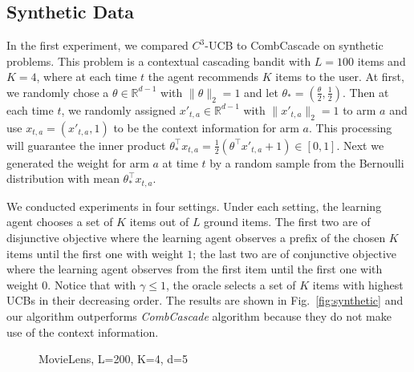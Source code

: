 \documentclass{article}
\newcommand{\RR}{\mathbb{R}}
\begin{document}
\subsection{Synthetic Data}
\label{sec:ExpSyn}

In the first experiment, we compared $C^3$-UCB to CombCascade on synthetic problems. This problem is a contextual cascading bandit with $L=100$ items and $K=4$, where at each time $t$ the agent recommends $K$ items to the user. At first, we randomly chose a $\theta \in \RR^{d-1}$ with $\|\theta \|_2 = 1$ and let $\theta_* = (\frac{\theta}{2}, \frac{1}{2})$. Then at each time $t$, we randomly assigned $x'_{t,a} \in \RR^{d-1}$ with $\|x'_{t,a}\|_2 = 1$ to arm $a$ and use $x_{t,a} = (x'_{t,a}, 1)$ to be the context information for arm $a$. This processing will guarantee the inner product $\theta_*^{\top}x_{t,a} = \frac{1}{2}(\theta^{\top}x'_{t,a} + 1) \in [0,1]$. Next we generated the weight for arm $a$ at time $t$ by a random sample from the Bernoulli distribution with mean $\theta_*^{\top}x_{t,a}$.

We conducted experiments in four settings. Under each setting, the learning agent chooses a set of $K$ items out of $L$ ground items. The first two are of disjunctive objective where the learning agent observes a prefix of the chosen $K$ items until the first one with weight $1$; the last two are of conjunctive objective where the learning agent observes from the first item until the first one with weight $0$. Notice that with $\gamma \leq 1$, the oracle selects a set of $K$ items with highest UCBs in their decreasing order. The results are shown in Fig.~\ref{fig:synthetic} and our algorithm outperforms {\it CombCascade} algorithm because they do not make use of the context information.

\begin{figure}
	\centering
	\caption{MovieLens, L=200, K=4, d=5}
	\label{fig:movielens} %
\end{figure}
\end{document}
